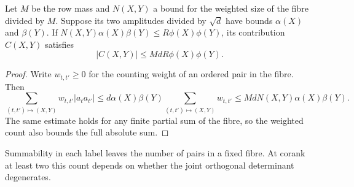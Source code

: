 \begin{lemma}\label{lem:row-fibre-weight}
Let \(M\) be the row mass and \(N(X,Y)\) a bound for the
weighted size of the fibre divided by \(M\). Suppose its two
amplitudes divided by \(\sqrt d\) have bounds \(\alpha(X)\)
and \(\beta(Y)\). If
\(N(X,Y)\alpha(X)\beta(Y)\le R\phi(X)\phi(Y)\),
its contribution \(C(X,Y)\) satisfies 
\[
 |C(X,Y)|\le MdR\phi(X)\phi(Y).
\]

\end{lemma}
\begin{proof}
Write \(w_{t,t'}\ge0\) for the counting weight of an ordered
pair in the fibre. Then
\[
 \sum_{(t,t')\mapsto(X,Y)} w_{t,t'}|a_t a_{t'}|
 \le d\alpha(X)\beta(Y)\sum_{(t,t')\mapsto(X,Y)}w_{t,t'}
 \le MdN(X,Y)\alpha(X)\beta(Y).
\]
The same estimate holds for any finite partial sum of the fibre,
so the weighted count also bounds the full absolute sum.
\end{proof}

Summability in each label leaves the number of pairs in a fixed fibre. At corank at least two this count depends on whether the joint orthogonal determinant degenerates.

